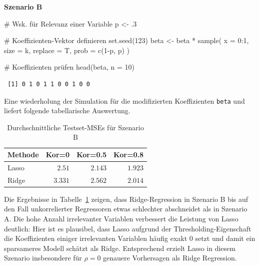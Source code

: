 \documentclass[
  a4paper,
  DIV=11,
  oneside]{scrreprt}
\newenvironment{Shaded}{\begin{snugshade}}{\end{snugshade}}
\newcommand{\AttributeTok}[1]{\textcolor[rgb]{0.40,0.45,0.13}{#1}}
\newcommand{\CommentTok}[1]{\textcolor[rgb]{0.37,0.37,0.37}{#1}}
\newcommand{\DecValTok}[1]{\textcolor[rgb]{0.68,0.00,0.00}{#1}}
\newcommand{\FunctionTok}[1]{\textcolor[rgb]{0.28,0.35,0.67}{#1}}
\newcommand{\NormalTok}[1]{\textcolor[rgb]{0.00,0.23,0.31}{#1}}
\newcommand{\OtherTok}[1]{\textcolor[rgb]{0.00,0.23,0.31}{#1}}
\newcommand{\SpecialCharTok}[1]{\textcolor[rgb]{0.37,0.37,0.37}{#1}}
\begin{document}
\textbf{Szenario B}

\begin{Shaded}
\begin{Highlighting}[]
\CommentTok{\# Wsk. für Relevanz einer Variable}
\NormalTok{p }\OtherTok{\textless{}{-}}\NormalTok{ .}\DecValTok{3}

\CommentTok{\# Koeffizienten{-}Vektor definieren}
\FunctionTok{set.seed}\NormalTok{(}\DecValTok{123}\NormalTok{)}
\NormalTok{beta }\OtherTok{\textless{}{-}}\NormalTok{ beta }\SpecialCharTok{*} \FunctionTok{sample}\NormalTok{(}
  \AttributeTok{x =} \DecValTok{0}\SpecialCharTok{:}\DecValTok{1}\NormalTok{, }
  \AttributeTok{size =}\NormalTok{ k, }
  \AttributeTok{replace =}\NormalTok{ T, }
  \AttributeTok{prob =} \FunctionTok{c}\NormalTok{(}\DecValTok{1}\SpecialCharTok{{-}}\NormalTok{p, p)}
\NormalTok{)}

\CommentTok{\# Koeffizienten prüfen}
\FunctionTok{head}\NormalTok{(beta, }\AttributeTok{n =} \DecValTok{10}\NormalTok{)}
\end{Highlighting}
\end{Shaded}

\begin{verbatim}
 [1] 0 1 0 1 1 0 0 1 0 0
\end{verbatim}

Eine wiederholung der Simulation für die modifizierten Koeffizienten
\texttt{beta} und liefert folgende tabellarische Auswertung.

\hypertarget{tbl-lrsimB}{}
\begin{longtable}{lrrr}
\caption{\label{tbl-lrsimB}Durchschnittliche Testset-MSEs für Szenario B }\tabularnewline

\toprule
Methode & Kor=0 & Kor=0.5 & Kor=0.8 \\ 
\midrule\addlinespace[2.5pt]
Lasso & $2.51$ & $2.143$ & $1.923$ \\ 
Ridge & $3.331$ & $2.562$ & $2.014$ \\ 
\bottomrule
\end{longtable}

Die Ergebnisse in Tabelle~\ref{tbl-lrsimB} zeigen, dass Ridge-Regression
in Szenario B bis auf den Fall unkorrelierter Regressoren etwas
schlechter abschneidet als in Szenario A. Die hohe Anzahl irrelevanter
Variablen verbessert die Leistung von Lasso deutlich: Hier ist es
plausibel, dass Lasso aufgrund der Thresholding-Eigenschaft die
Koeffizienten einiger irrelevanten Variablen häufig exakt \(0\) setzt
und damit ein sparsameres Modell schätzt als Ridge. Entsprechend erzielt
Lasso in diesem Szenario insbesondere für \(\rho = 0\) genauere
Vorhersagen als Ridge Regression.
\end{document}

